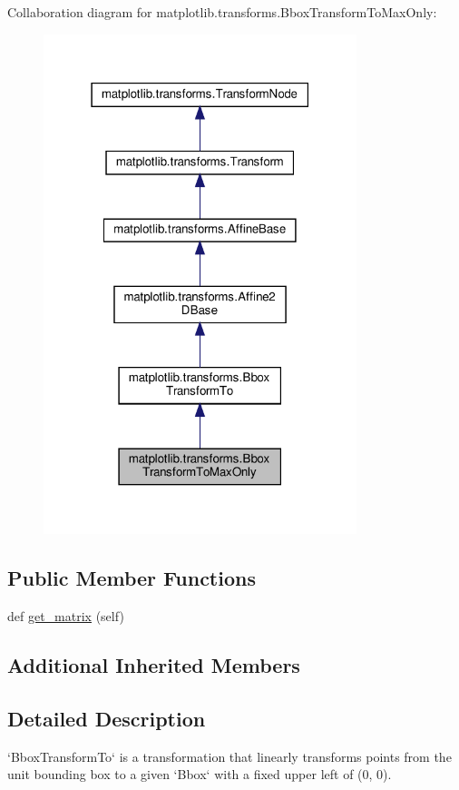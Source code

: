 Collaboration diagram for matplotlib.\+transforms.\+Bbox\+Transform\+To\+Max\+Only\+:
\nopagebreak
\begin{figure}[H]
\begin{center}
\leavevmode
\includegraphics[width=259pt]{classmatplotlib_1_1transforms_1_1BboxTransformToMaxOnly__coll__graph}
\end{center}
\end{figure}
\subsection*{Public Member Functions}
\begin{DoxyCompactItemize}
\item 
def \hyperlink{classmatplotlib_1_1transforms_1_1BboxTransformToMaxOnly_adf9bce8b822f41ab027488422e46dd11}{get\+\_\+matrix} (self)
\end{DoxyCompactItemize}
\subsection*{Additional Inherited Members}


\subsection{Detailed Description}
\begin{DoxyVerb}`BboxTransformTo` is a transformation that linearly transforms points from
the unit bounding box to a given `Bbox` with a fixed upper left of (0, 0).
\end{DoxyVerb}
 


